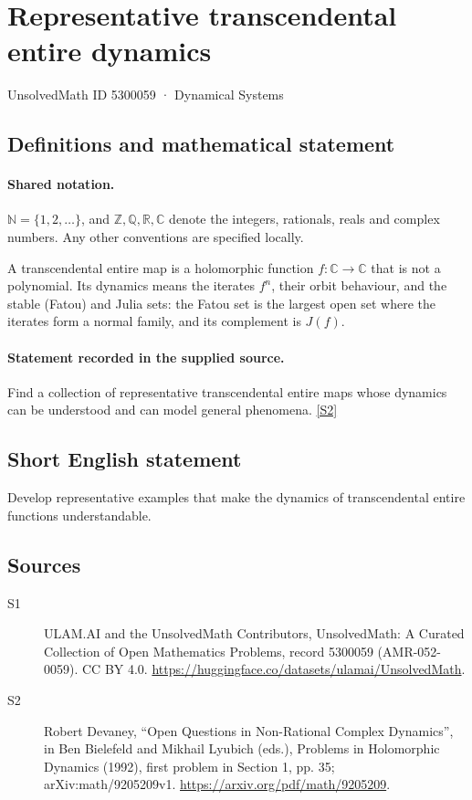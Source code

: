 \documentclass[11pt]{article}
\newcommand{\sref}[2]{\hyperlink{source:#1:#2}{[S#2]}}
\begin{document}
\setcounter{section}{5300058}
\section{Representative transcendental entire dynamics}\label{5300059}
{\small\sffamily UnsolvedMath ID 5300059 · Dynamical Systems}
\subsection{Definitions and mathematical statement}

\paragraph{Shared notation.}$\mathbb N=\{1,2,\ldots\}$, and $\mathbb Z,\mathbb Q,\mathbb R,\mathbb C$ denote the integers, rationals, reals and complex numbers. Any other conventions are specified locally.


A transcendental entire map is a holomorphic function $f:\mathbb C\to\mathbb C$ that is not a polynomial. Its dynamics means the iterates $f^n$, their orbit behaviour, and the stable (Fatou) and Julia sets: the Fatou set is the largest open set where the iterates form a normal family, and its complement is $J(f)$.
\paragraph{Statement recorded in the supplied source.}
Find a collection of representative transcendental entire maps whose dynamics can be understood and can model general phenomena. \sref{5300059}{2}
\subsection{Short English statement}
Develop representative examples that make the dynamics of transcendental entire functions understandable.
\subsection{Sources}
\begin{description}
\item[\hypertarget{source:5300059:1}{S1}] ULAM.AI and the UnsolvedMath Contributors, UnsolvedMath: A Curated Collection of Open Mathematics Problems, record 5300059 (AMR-052-0059). CC BY 4.0. \url{https://huggingface.co/datasets/ulamai/UnsolvedMath}.
\item[\hypertarget{source:5300059:2}{S2}] Robert Devaney, ``Open Questions in Non-Rational Complex Dynamics'', in Ben Bielefeld and Mikhail Lyubich (eds.), Problems in Holomorphic Dynamics (1992), first problem in Section 1, pp. 35; arXiv:math/9205209v1. \url{https://arxiv.org/pdf/math/9205209}.
\end{description}
\label{end:5300059}
\end{document}
